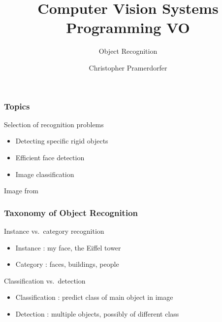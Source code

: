 \documentclass[xetex,professionalfont]{beamer}
\title{Computer Vision Systems Programming VO}
\subtitle{Object Recognition}
\author{Christopher Pramerdorfer}
\institute{Computer Vision Lab, Vienna University of Technology}
\begin{document}

\begin{frame}
\maketitle
\end{frame}


\begin{frame}
\frametitle{Topics}

Selection of recognition problems
\begin{itemize}
    \item Detecting specific rigid objects
    \item Efficient face detection
    \item Image classification
\end{itemize}

\bigskip
\begin{center}
    {\centering Image from \cite{grauman2011}}
\end{center}

\end{frame}


\begin{frame}
\frametitle{Taxonomy of Object Recognition}

Instance vs.\ category recognition
\begin{itemize}
    \item Instance : my face, the Eiffel tower
    \item Category : faces, buildings, people %
\end{itemize}

\bigskip
Classification vs.\ detection
\begin{itemize}
    \item Classification : predict class of main object in image %
    \item Detection : multiple objects, possibly of different class %
\end{itemize}

\end{frame}
\end{document}
